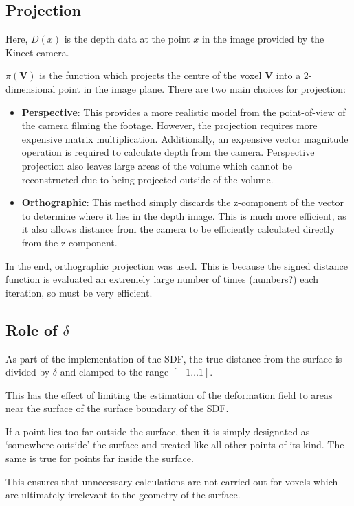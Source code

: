 \documentclass[12pt,twoside]{report}
\begin{document}
\subsection{Projection}

Here, $D(x)$ is the depth data at the point $x$ in the image provided by the Kinect camera.

$\pi(\textbf{V})$ is the function which projects the centre of the voxel \textbf{V} into a 2-dimensional point in the image plane. There are two main choices for projection:
\begin{itemize}
\item \textbf{Perspective}: This provides a more realistic model from the point-of-view of the camera filming the footage. 
However, the projection requires more expensive matrix multiplication. Additionally, an expensive vector magnitude operation is required to calculate depth from the camera.
Perspective projection also leaves large areas of the volume which cannot be reconstructed due to being projected outside of the volume.

\item \textbf{Orthographic}: This method simply discards the z-component of the vector to determine where it lies in the depth image. This is much more efficient, as it also allows distance from the camera to be efficiently calculated directly from the z-component.
\end{itemize} 

In the end, orthographic projection was used. This is because the signed distance function is evaluated an extremely large number of times (numbers?) each iteration, so must be very efficient.

\subsection{Role of $\delta$}

As part of the implementation of the SDF, the true distance from the surface is divided by $\delta$ and clamped to the range $[-1 \ldots 1]$.

This has the effect of limiting the estimation of the deformation field to areas near the surface of the surface boundary of the SDF. 

If a point lies too far outside the surface, then it is simply designated as `somewhere outside' the surface and treated like all other points of its kind. The same is true for points far inside the surface.

This ensures that unnecessary calculations are not carried out for voxels which are ultimately irrelevant to the geometry of the surface.
\end{document}
